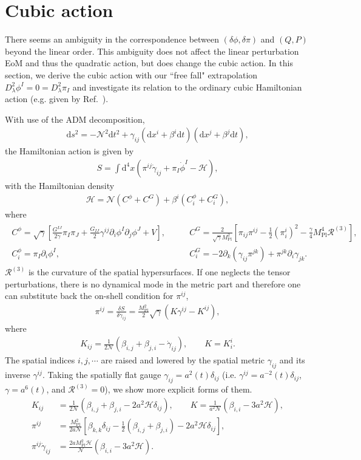 \documentclass[aps, prd
, preprint
, nofootinbib 
, notitlepage
, longbibliography
]{revtex4-1}
\newcommand{\var}[2]{\frac{\delta #1}{\delta #2}}
\newcommand{\dd}{\mathrm{d}}
\newcommand{\Mpl}{M_\text{Pl}}
\newcommand{\dps}{\displaystyle}
\newcommand{\calH}{\mathcal{H}}
\newcommand{\scrH}{\mathscr{H}}
\newcommand{\calN}{\mathcal{N}}
\newcommand{\calR}{\mathcal{R}}
\newcommand{\dphi}{\delta\phi}
\newcommand{\dpi}{\delta\pi}
\newcommand{\bae}[1]{\begin{align} #1 \end{align}}
\begin{document}
\section{Cubic action}

There seems an ambiguity in the correspondence between $(\dphi,\dpi)$ and $(Q,P)$ beyond the linear order.
This ambiguity does not affect the linear perturbation EoM and thus the quadratic action, but does change the cubic action.
In this section, we derive the cubic action with our ``free fall" extrapolation $D_\lambda^2\phi^I=0=D_\lambda^2\pi_I$ and investigate its relation to the ordinary cubic Hamiltonian action (e.g. given by Ref.~\cite{Butchers:2018hds}).

With use of the ADM decomposition,
\bae{
    \dd s^2=-\calN^2\dd t^2+\gamma_{ij}(\dd x^i+\beta^i\dd t)(\dd x^j+\beta^j\dd t),
}
the Hamiltonian action is given by
\bae{
    S=\int\dd^4x(\pi^{ij}\dot{\gamma}_{ij}+\pi_I\dot{\phi}^I-\scrH),
}
with the Hamiltonian density
\bae{
    \scrH=\calN(C^\phi+C^G)+\beta^i(C_i^\phi+C_i^G),
}
where
\bae{
    \begin{array}{ll}
        \dps
        C^\phi=\sqrt{\gamma}\left[\frac{G^{IJ}}{2\gamma}\pi_I\pi_J+\frac{G_{IJ}}{2}\gamma^{ij}\partial_i\phi^I\partial_j\phi^J+V\right], & 
        \dps\qquad
        C^G=\frac{2}{\sqrt{\gamma}\Mpl^2}\left[\pi_{ij}\pi^{ij}-\frac{1}{2}\left(\pi^i_i\right)^2-\frac{\gamma}{4}\Mpl^4\calR^{(3)}\right], \\
        C^\phi_i=\pi_I\partial_i\phi^I, &
        \dps\qquad
        C^G_i=-2\partial_k(\gamma_{ij}\pi^{jk})+\pi^{jk}\partial_i\gamma_{jk}.
    \end{array}
}
$\calR^{(3)}$ is the curvature of the spatial hypersurfaces.
If one neglects the tensor perturbations, there is no dynamical mode in the metric part and therefore one can substitute back the on-shell condition for $\pi^{ij}$,
\bae{
    \pi^{ij}=\var{S}{\dot{\gamma}_{ij}}=\frac{\Mpl^2}{2}\sqrt{\gamma}(K\gamma^{ij}-K^{ij}),
}
where
\bae{
    K_{ij}=\frac{1}{2\calN}(\beta_{i,j}+\beta_{j,i}-\dot{\gamma}_{ij}), \qquad K=K^i_i.
}
The spatial indices $i,j,\cdots$ are raised and lowered by the spatial metric $\gamma_{ij}$ and its inverse $\gamma^{ij}$.
Taking the spatially flat gauge $\gamma_{ij}=a^2(t)\delta_{ij}$ (i.e. $\gamma^{ij}=a^{-2}(t)\delta_{ij}$, $\gamma=a^6(t)$, and $\calR^{(3)}=0$), we show more explicit forms of them.
\bae{
    K_{ij}&=\frac{1}{2\calN}(\beta_{i,j}+\beta_{j,i}-2a^2\calH\delta_{ij}), \qquad K=\frac{1}{a^2\calN}(\beta_{i,i}-3a^2\calH), \\
    \pi^{ij}&=\frac{\Mpl^2}{2a\calN}\left[\beta_{k,k}\delta_{ij}-\frac{1}{2}(\beta_{i,j}+\beta_{j,i})-2a^2\calH\delta_{ij}\right], \\
    \pi^{ij}\dot{\gamma}_{ij}&=\frac{2a\Mpl^2\calH}{\calN}(\beta_{i,i}-3a^2\calH).
}
\end{document}
